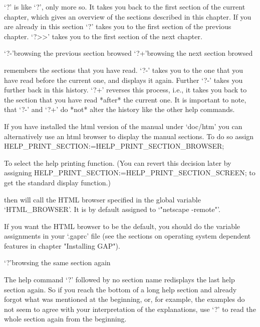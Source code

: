 `?\<\<' is like `?\<', only more so. It takes you back to the first
section of the current chapter, which gives an overview of the sections
described in this chapter. If you are already in this section `?\<\<'
takes you to the first section of the previous chapter. `?>>' takes you
to the first section of the next chapter.

\>`?-'{browsing the previous section browsed}
\>`?+'{browsing the next section browsed}

{\GAP} remembers the sections that you have read. `?-' takes you to the
one that you have read before the current one, and displays it again.
Further `?-' takes you further back in this history. `?+' reverses this
process, i.e., it takes you back to the section that you have read
*after* the current one. It is important to note, that `?-' and `?+' do
*not* alter the history like the other help commands.



If you have installed the html version of the manual under `doc/htm' you can
alternatively use an html browser to display the manual sections. To do so
assign
\begintt
HELP_PRINT_SECTION:=HELP_PRINT_SECTION_BROWSER;
\endtt

To select the help printing function. (You can revert this decision later by
assigning
\begintt
HELP_PRINT_SECTION:=HELP_PRINT_SECTION_SCREEN;
\endtt
to get the standard display function.)

{\GAP} then will call the HTML browser specified in the global variable
`HTML_BROWSER'. It is by default assigned to `"netscape -remote"'.

If you want the HTML browser to be the default, you should do the variable
assignments in your `.gaprc' file (see the sections on operating
system dependent features in chapter "Installing GAP").


\>`?'{browsing the same section again}

The help command `?' followed by no section name redisplays the last help
section again. So if you reach the bottom of a long help section and
already forgot what was mentioned at the beginning, or, for example, the
examples do not seem to agree with your interpretation of the
explanations, use `?' to read the whole section again from the beginning.

